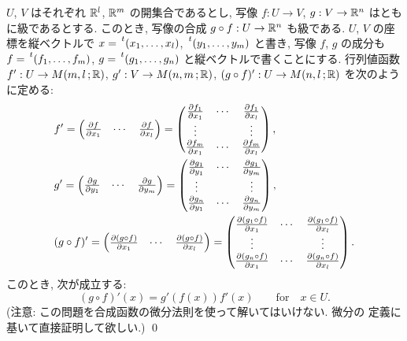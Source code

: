 \documentclass[12pt,twoside]{jarticle}
\begin{document}
\begin{question}
  $U$, $V$ はそれぞれ ${\mathbb R}^l$, ${\mathbb R}^m$ の開集合であるとし, %
  写像 $f:U\to V$, $g:V\to{\mathbb R}^n$ はともに級であるとする. %
  このとき, 写像の合成 $g\circ f:U\to {\mathbb R}^n$ も級である. %
  $U$, $V$ の座標を縦ベクトルで $x=\transposed(x_1,\dots,x_l)$,
  $\transposed(y_1,\dots,y_m)$ と書き, 写像 $f$, $g$ の成分も 
  $f=\transposed{(f_1,\dots,f_m)}$, $g=\transposed{(g_1,\dots,g_n)}$ 
  と縦ベクトルで書くことにする. %
  行列値函数 $f':U\to M(m,l\,;{\mathbb R})$, $g':V\to M(n,m\,;{\mathbb R})$, %
  $(g\circ f)': U\to M(n,l\,;{\mathbb R})$ を次のように定める:
  \begin{align*}
    &
    f' =
    \begin{pmatrix}
      \frac{\partial f}{\partial x_1} & \cdots & \frac{\partial f}{\partial x_l}
    \end{pmatrix}
    =
    \begin{pmatrix}
      \frac{\partial f_1}{\partial x_1} & \cdots & \frac{\partial f_1}{\partial x_l} \\
      \vdots                    &        & \vdots                    \\
      \frac{\partial f_m}{\partial x_1} & \cdots & \frac{\partial f_m}{\partial x_l}
    \end{pmatrix},
    \\
    &
    g' =
    \begin{pmatrix}
      \frac{\partial g}{\partial y_1} & \cdots & \frac{\partial g}{\partial y_m}
    \end{pmatrix}
    =
    \begin{pmatrix}
      \frac{\partial g_1}{\partial y_1} & \cdots & \frac{\partial g_1}{\partial y_m} \\
      \vdots                    &        & \vdots                    \\
      \frac{\partial g_n}{\partial y_1} & \cdots & \frac{\partial g_n}{\partial y_m}
    \end{pmatrix},
    \\
    &
    (g\circ f)' =
    \begin{pmatrix}
      \frac{\partial(g\circ f)}{\partial x_1} & \cdots & \frac{\partial(g\circ f)}{\partial x_l}
    \end{pmatrix}
    =
    \begin{pmatrix}
      \frac{\partial(g_1\circ f)}{\partial x_1} & \cdots & \frac{\partial(g_1\circ f)}{\partial x_l} \\
      \vdots                            &        & \vdots                    \\
      \frac{\partial(g_n\circ f)}{\partial x_1} & \cdots & \frac{\partial(g_n\circ f)}{\partial x_l}
    \end{pmatrix}.
  \end{align*}
  このとき, 次が成立する:
  \[
    (g\circ f)'(x) = g'(f(x))f'(x)
    \qquad \text{for} \quad x \in U.
  \]%
  (注意: この問題を合成函数の微分法則を使って解いてはいけない. 微分の
  定義に基いて直接証明して欲しい.)
  \qed
\end{question}
\end{document}
